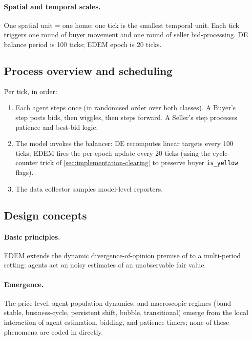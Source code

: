 \paragraph{Spatial and temporal scales.} One spatial unit = one home;
one tick is the smallest temporal unit. Each tick triggers one round
of buyer movement and one round of seller bid-processing. DE balance
period is 100 ticks; EDEM epoch is 20 ticks.

\subsection{Process overview and scheduling}

Per tick, in order:
\begin{enumerate}[leftmargin=*,nosep]
\item Each agent steps once (in randomised order over both classes).
      A Buyer's step posts bids, then wiggles, then steps forward.
      A Seller's step processes patience and best-bid logic.
\item The model invokes the balancer:
      DE recomputes linear targets every 100 ticks;
      EDEM fires the per-epoch update every 20 ticks (using the
      cycle-counter trick of \cref{sec:implementation-clearing} to
      preserve buyer \texttt{is\_yellow} flags).
\item The data collector samples model-level reporters.
\end{enumerate}

\subsection{Design concepts}

\paragraph{Basic principles.} EDEM extends the dynamic
divergence-of-opinion premise of \citet{miller1977} to a
multi-period setting; agents act on noisy estimates of an unobservable
fair value.

\paragraph{Emergence.} The price level, agent population dynamics,
and macroscopic regimes (band-stable, business-cycle, persistent
shift, bubble, transitional) emerge from the local interaction of
agent estimation, bidding, and patience timers; none of these
phenomena are coded in directly.

